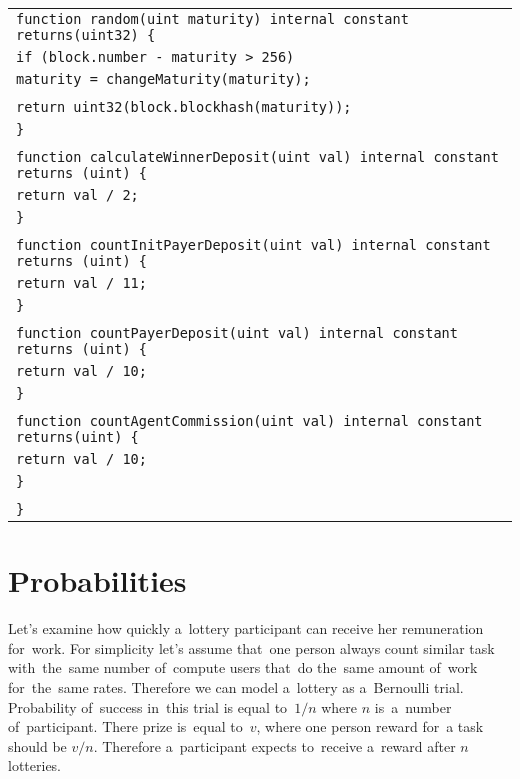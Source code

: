 \documentclass[a4paper]{article}
\begin{document}
\begin{tabularx}{\linewidth}{l}
        \qquad\texttt{function random(uint maturity) internal constant returns(uint32) \{}\\
        \qquad\qquad\texttt{if (block.number - maturity > 256)}\\
        \qquad\qquad\qquad\texttt{maturity = changeMaturity(maturity);}\\
        \\
        \qquad\qquad\texttt{return uint32(block.blockhash(maturity));}\\
        \qquad\texttt{\}}\\
        \\
        \qquad\texttt{function calculateWinnerDeposit(uint val) internal constant returns (uint) \{}\\
        \qquad\qquad\texttt{return val / 2;}\\
        \qquad\texttt{\}}\\
        \\
        \qquad\texttt{function countInitPayerDeposit(uint val) internal constant returns (uint) \{}\\
        \qquad\qquad\texttt{return val / 11;}\\
        \qquad\texttt{\}}\\
        \\
        \qquad\texttt{function countPayerDeposit(uint val) internal constant returns (uint) \{}\\
        \qquad\qquad\texttt{return val / 10;}\\
        \qquad\texttt{\}}\\
        \\
        \qquad\texttt{function countAgentCommission(uint val) internal constant returns(uint) \{}\\
        \qquad\qquad\texttt{return val / 10;}\\
        \qquad\texttt{\}}\\
        \\
        \texttt{\}}\\
    \end{tabularx}

\section{Probabilities}

    Let's examine how quickly a~lottery participant can receive her remuneration for~work. For simplicity let's assume
    that~one person always count similar task with~the~same number of~compute users that~do the~same amount of~work
    for~the~same rates. Therefore we can model a~lottery as a~Bernoulli trial. Probability of~success in~this trial is
    equal to~$1/n$ where $n$ is~a~number of~participant. There prize is~equal to~$v$, where one person reward for~a
    task should be $v/n$. Therefore a~participant expects to~receive a~reward after $n$ lotteries.
\end{document}
